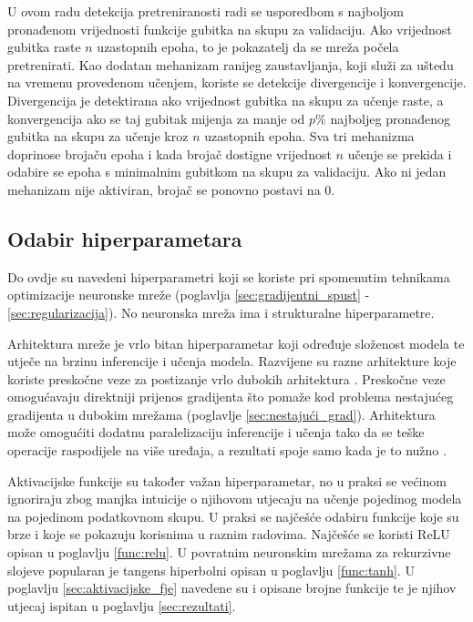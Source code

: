 \documentclass[times, utf8, numeric, diplomski]{fer}
\def\secref#1{(poglavlje \ref{#1})}
\begin{document}
U ovom radu detekcija pretreniranosti radi se usporedbom s najboljom pronađenom vrijednosti funkcije gubitka na skupu za validaciju. Ako vrijednost gubitka raste $n$ uzastopnih epoha, to je pokazatelj da se mreža počela pretrenirati. Kao dodatan mehanizam ranijeg zaustavljanja, koji služi za uštedu na vremenu provedenom učenjem, koriste se detekcije divergencije i konvergencije. Divergencija je detektirana ako vrijednost gubitka na skupu za učenje raste, a konvergencija ako se taj gubitak mijenja za manje od $p\%$ najboljeg pronađenog gubitka na skupu za učenje kroz $n$ uzastopnih epoha. Sva tri mehanizma doprinose brojaču epoha i kada brojač dostigne vrijednost $n$ učenje se prekida i odabire se epoha s minimalnim gubitkom na skupu za validaciju. Ako ni jedan mehanizam nije aktiviran, brojač se ponovno postavi na $0$.

\subsection{Odabir hiperparametara}
Do ovdje su navedeni hiperparametri koji se koriste pri spomenutim tehnikama optimizacije neuronske mreže (poglavlja \ref{sec:gradijentni_spust} - \ref{sec:regularizacija}). No neuronska mreža ima i strukturalne hiperparametre.

Arhitektura mreže je vrlo bitan hiperparametar koji određuje složenost modela te utječe na brzinu inferencije i učenja modela. Razvijene su razne arhitekture koje koriste preskočne veze za postizanje vrlo dubokih arhitektura \citep{resnet, densenet}. Preskočne veze omogućavaju direktniji prijenos gradijenta što pomaže kod problema nestajućeg gradijenta u dubokim mrežama \secref{sec:nestajući_grad}. Arhitektura može omogućiti dodatnu paralelizaciju inferencije i učenja tako da se teške operacije raspodijele na više uređaja, a rezultati spoje samo kada je to nužno \citep{alexnet}.

Aktivacijske funkcije su također važan hiperparametar, no u praksi se većinom ignoriraju zbog manjka intuicije o njihovom utjecaju na učenje pojedinog modela na pojedinom podatkovnom skupu. U praksi se najčešće odabiru funkcije koje su brze i koje se pokazuju korisnima u raznim radovima. Najčešće se koristi ReLU opisan u poglavlju \ref{func:relu}. U povratnim neuronskim mrežama za rekurzivne slojeve popularan je tangens hiperbolni opisan u poglavlju \ref{func:tanh}. U poglavlju \ref{sec:aktivacijske_fje} navedene su i opisane brojne funkcije te je njihov utjecaj ispitan u poglavlju \ref{sec:rezultati}.
\end{document}
